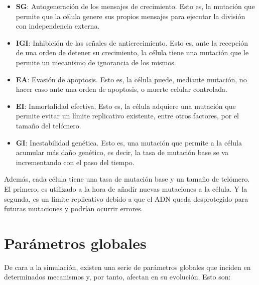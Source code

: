 \begin{itemize}
    \item \textbf{SG}: Autogeneración de los mensajes de crecimiento. Esto es, la mutación que permite que la
    célula genere sus propios mensajes para ejecutar la división con independencia externa.
    \item \textbf{IGI}: Inhibición de las señales de anticrecimiento. Esto es, ante la recepción de una orden
    de detener su crecimiento, la célula tiene una mutación que le permite un mecanismo de ignorancia de los mismos.
    \item \textbf{EA}: Evasión de apoptosis. Esto es, la célula puede, mediante mutación, no hacer caso ante
    una orden de apoptosis, o muerte celular controlada.
    \item \textbf{EI}: Inmortalidad efectiva. Esto es, la célula adquiere una mutación que permite evitar un límite
    replicativo existente, entre otros factores, por el tamaño del telómero.
    \item \textbf{GI}: Inestabilidad genética. Esto es, una mutación que permite a la célula acumular más daño genético, es decir,
    la tasa de mutación base se va incrementando con el paso del tiempo.
\end{itemize}

Además, cada célula tiene una tasa de mutación base y un tamaño de telómero. El primero, es utilizado a la hora
de añadir nuevas mutaciones a la célula. Y la segunda, es un límite replicativo debido a que el ADN queda
desprotegido para futuras mutaciones y podrían ocurrir errores.

\section{Parámetros globales}

De cara a la simulación, existen una serie de parámetros globales que inciden en determinados mecanismos y,
por tanto, afectan en su evolución. Esto son:

